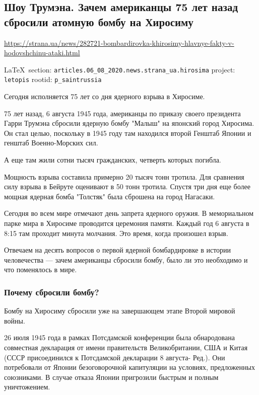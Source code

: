  
 
\subsection{Шоу Трумэна. Зачем американцы 75 лет назад сбросили атомную бомбу на Хиросиму}
\label{sec:articles.06_08_2020.news.strana_ua.hirosima}
\url{https://strana.ua/news/282721-bombardirovka-khirosimy-hlavnye-fakty-v-hodovshchinu-ataki.html}
  
\vspace{0.5cm}
 {\ifDEBUG\small\LaTeX~section: \verb|articles.06_08_2020.news.strana_ua.hirosima| project: \verb|letopis| rootid: \verb|p_saintrussia| \fi}
\vspace{0.5cm}

Сегодня исполняется 75 лет со дня ядерного взрыва в Хиросиме.

75 лет назад, 6 августа 1945 года, американцы по приказу своего президента
Гарри Трумэна сбросили ядерную бомбу "Малыш" на японский город Хиросима. Он
стал целью, поскольку в 1945 году там находился второй Генштаб Японии и генштаб
Военно-Морских сил. 

А еще там жили сотни тысяч гражданских, четверть которых погибла. 

Мощность взрыва составила примерно 20 тысяч тонн тротила. Для сравнения силу
взрыва в Бейруте оценивают в 50 тонн тротила. Спустя три дня еще более мощная
ядерная бомба "Толстяк" была сброшена на город Нагасаки.

Сегодня во всем мире отмечают день запрета ядерного оружия. В мемориальном
парке мира в Хиросиме проводится церемония памяти. Каждый год 6 августа в 8:15
там проходит минута молчания. Это время, когда произошел взрыв.

Отвечаем на десять вопросов о первой ядерной бомбардировке в истории
человечества --- зачем американцы сбросили бомбу, было ли это необходимо и что
поменялось в мире.

\subsubsection{Почему сбросили бомбу?}

Бомбу на Хиросиму сбросили уже на завершающем этапе Второй мировой войны.

26 июля 1945 года в рамках Потсдамской конференции была обнародована
совместная декларация от имени правительств Великобритании, США и Китая (СССР
присоединился к Потсдамской декларации 8 августа- Ред.). Они потребовали от
Японии безоговорочной капитуляции на условиях, предложенных союзниками. В
случае отказа Японии пригрозили быстрым и полным уничтожением.

